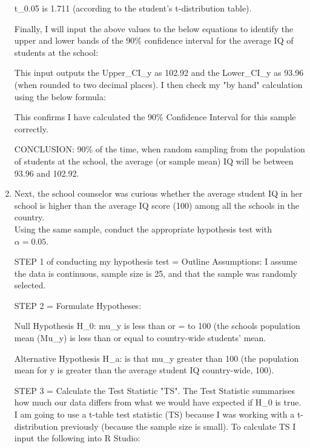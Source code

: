 \documentclass[12pt,letterpaper]{article}
\begin{document}
\begin{enumerate}
		
			
		t\_0.05 is 1.711 (according to the student's t-distribution table). 
		
		Finally, I will input the above values to the below equations to identify the upper and lower bands of the 90\% confidence interval for the average IQ of students at the school:
		
		
		
		This input outputs the Upper\_CI\_y as 102.92 and the Lower\_CI\_y as 93.96 (when rounded to two decimal places).
		I then check my "by hand" calculation using the below formula:
		
		
		
		This confirms I have calculated the 90\% Confidence Interval for this sample correctly.
		
		CONCLUSION:
		90\% of the time, when random sampling from the population of students at the school, the average (or sample mean) IQ will be between 93.96 and 102.92.
				
		\item Next, the school counselor was curious  whether  the average student IQ in her school is higher than the average IQ score (100) among all the schools in the country.\\ 
		
		\noindent Using the same sample, conduct the appropriate hypothesis test with $\alpha=0.05$.
		
		
		STEP 1 of conducting my hypothesis test = Outline Assumptions:
		I assume the data is continuous, sample size is 25, and that the sample was randomly selected.
		
		STEP 2 = Formulate Hypotheses:
	
		Null Hypothesis H\_0: mu\_y is less than or = to 100 (the schools population mean (Mu\_y) is less than or equal to country-wide students' mean.
		
		Alternative Hypothesis H\_a: is that mu\_y greater than 100 (the population mean for y is greater than the average student IQ country-wide, 100).
		
		STEP 3 = Calculate the Test Statistic "TS". The Test Statistic summarises how much our data differs from what we would have expected if  H\_0 is true. I am going to use a t-table test statistic (TS) because I was working with a t-distribution previously (because the sample size is small). To calculate TS I input the following into R Studio:
		

\end{enumerate}
\end{document}
